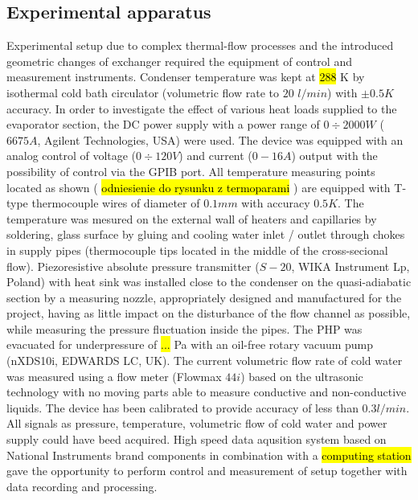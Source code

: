 \documentclass[article]{elsarticle}
\newcommand{\hlc}[2][yellow]{ {\sethlcolor{#1} \hl{#2}} }
\begin{document}
\subsection{Experimental apparatus}
Experimental setup due to complex thermal-flow processes and the introduced geometric changes of exchanger required the equipment of control and measurement instruments. Condenser temperature was kept at \hlc{288}K by isothermal cold bath circulator (volumetric flow rate to $20$ $l/min$) with $\pm0.5K$accuracy. In order to investigate the effect of various heat loads supplied to the evaporator section, the DC power supply with a power range of $0\div2000W$ ($6675A$, Agilent Technologies, USA) were used. The device was equipped with an analog control of voltage ($0\div120V$) and current ($0-16A$) output with the possibility of control via the GPIB port. All temperature measuring points located as shown (\hlc{odniesienie do rysunku z termoparami}) are equipped with T-type thermocouple wires of diameter of $0.1mm$ with accuracy $0.5K$. The temperature was mesured on the external wall of heaters and capillaries by soldering, glass surface by gluing and cooling water inlet / outlet through chokes in supply pipes (thermocouple tips located in the middle of the cross-secional flow). Piezoresistive absolute pressure transmitter ($S-20$, WIKA Instrument Lp, Poland) with heat sink was installed close to the condenser on the quasi-adiabatic section by a measuring nozzle, appropriately designed and manufactured for the project, having as little impact on the disturbance of the flow channel as possible, while measuring the pressure fluctuation inside the pipes. The PHP was evacuated for underpressure of \hlc{...}Pa with an oil-free rotary vacuum pump (nXDS10i, EDWARDS LC, UK). The current volumetric flow rate of cold water was measured using a flow meter (Flowmax $44i$) based on the ultrasonic technology with no moving parts able to measure conductive and non-conductive liquids. The device has been calibrated to provide accuracy of less than $0.3 l/min$.\\
All signals as pressure, temperature, volumetric flow of cold water and power supply could have beed acquired. High speed data aqusition system based on National Instruments brand components in combination with a \hlc{computing station} gave the opportunity to perform control and measurement of setup together with data recording and processing.
\end{document}

